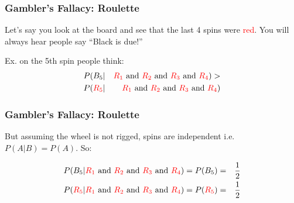 \documentclass[handout]{beamer}
\newcommand{\blue}[1]{\textcolor{blue2}{#1}}
\begin{document}
\begin{frame}
\frametitle{Gambler's Fallacy: Roulette}
Let's say you look at the board and see that the last 4 spins were \textcolor{red}{red}. \pause You will always hear people say \blue{``Black is due!''}\\

\pause \vspace{0.25cm}

Ex. on the 5th spin people think:
\begin{eqnarray*}
P(B_5 &|& \textcolor{red}{R_1} \mbox{ and } \textcolor{red}{R_2} \mbox{ and } \textcolor{red}{R_3} \mbox{ and } \textcolor{red}{R_4}) > \\
P(\textcolor{red}{R_5} &|& \textcolor{red}{R_1} \mbox{ and } \textcolor{red}{R_2} \mbox{ and } \textcolor{red}{R_3} \mbox{ and } \textcolor{red}{R_4})
\end{eqnarray*}

\end{frame}


\begin{frame}
\frametitle{Gambler's Fallacy: Roulette}
But assuming the wheel is not rigged, spins are independent i.e. $P(A|B) = P(A)$.  So:

\pause \begin{eqnarray*}
P(B_5 | \textcolor{red}{R_1} \mbox{ and } \textcolor{red}{R_2} \mbox{ and } \textcolor{red}{R_3} \mbox{ and } \textcolor{red}{R_4}) = P(B_5) &=& \frac{1}{2} \\
P(\textcolor{red}{R_5} | \textcolor{red}{R_1} \mbox{ and } \textcolor{red}{R_2} \mbox{ and } \textcolor{red}{R_3} \mbox{ and } \textcolor{red}{R_4}) = P(\textcolor{red}{R_5}) &=& \frac{1}{2}
\end{eqnarray*}


\end{frame}
\end{document}
